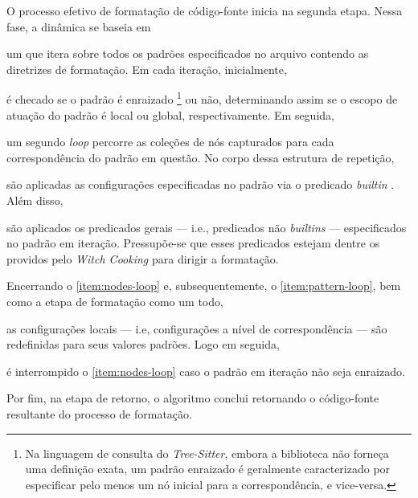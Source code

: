 \documentclass
  [11pt,a4paper,english,brazil,openright,sumario=tradicional,twoside]
  {abntex2}
\newcommand{\treesitter}{\textit{Tree-Sitter}\xspace}
\newcommand{\witchcooking}{\textit{Witch Cooking}\xspace}
\begin{document}
  O processo efetivo de formatação de código-fonte inicia na segunda etapa.
  Nessa fase, a dinâmica se baseia em
  \begin{inparaenum}
    \item \label{item:pattern-loop} um \textit{} que itera sobre
          todos os padrões especificados no arquivo contendo as diretrizes de
          formatação. Em cada iteração, inicialmente,
    \item é checado se o padrão é enraizado%
          \footnote
            { Na linguagem de consulta do \treesitter, embora a biblioteca não
              forneça uma definição exata, um padrão enraizado é geralmente
              caracterizado por especificar pelo menos um nó inicial para a
              correspondência, e vice-versa.}
          ou não, determinando assim se o escopo de atuação do padrão é local
          ou global, respectivamente. Em seguida,
    \item \label{item:nodes-loop} um segundo \textit{loop} percorre as coleções
          de nós capturados para cada correspondência do padrão em questão. No
          corpo dessa estrutura de repetição,
    \item são aplicadas as configurações especificadas no padrão via o
          predicado \textit{builtin} . Além disso,
    \item são aplicados os predicados gerais --- i.e., predicados não
          \textit{builtins} --- especificados no padrão em iteração.
          Pressupõe-se que esses predicados estejam dentre os providos pelo
          \witchcooking para dirigir a formatação.

          Encerrando o \cref{item:nodes-loop} e, subsequentemente, o
          \cref{item:pattern-loop}, bem como a etapa de formatação como um
          todo,
    \item as configurações locais --- i.e, configurações a nível de
          correspondência --- são redefinidas para seus valores padrões. Logo
          em seguida,
    \item é interrompido o \cref{item:nodes-loop} caso o padrão em iteração não
          seja enraizado.
  \end{inparaenum}
  Por fim, na etapa de retorno, o algoritmo conclui retornando o código-fonte
  resultante do processo de formatação.
\end{document}
